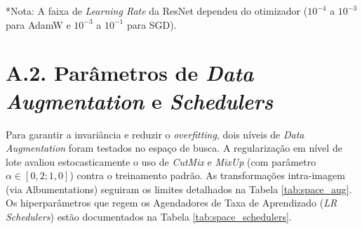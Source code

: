 \begin{table}[ht!]
    \centering
    \caption{Espaço de busca para Redes Convolucionais Clássicas e Robustas.}
    \label{tab:space_robust_cnn}
    \vspace{0.1cm}
    \footnotesize{*Nota: A faixa de \textit{Learning Rate} da ResNet dependeu do otimizador ($10^{-4}$ a $10^{-3}$ para AdamW e $10^{-3}$ a $10^{-1}$ para SGD).}
\end{table}

\section*{A.2. Parâmetros de \textit{Data Augmentation} e \textit{Schedulers}}

Para garantir a invariância e reduzir o \textit{overfitting}, dois níveis de \textit{Data Augmentation} foram testados no espaço de busca. A regularização em nível de lote avaliou estocasticamente o uso de \textit{CutMix} e \textit{MixUp} (com parâmetro $\alpha \in [0,2; 1,0]$) contra o treinamento padrão. As transformações intra-imagem (via Albumentations) seguiram os limites detalhados na Tabela \ref{tab:space_aug}. Os hiperparâmetros que regem os Agendadores de Taxa de Aprendizado (\textit{LR Schedulers}) estão documentados na Tabela \ref{tab:space_schedulers}.

